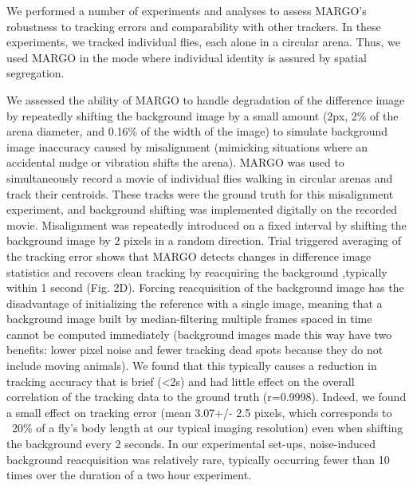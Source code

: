 \documentclass[10pt]{article}
\begin{document}
\begin{multicols}{2}
We performed a number of experiments and analyses to assess MARGO's robustness to tracking errors and comparability with other trackers. In these experiments, we tracked individual flies, each alone in a circular arena. Thus, we used MARGO in the mode where individual identity is assured by spatial segregation.

We assessed the ability of MARGO to handle degradation of the difference image by repeatedly shifting the background image by a small amount (2px, 2\% of the arena diameter, and 0.16\% of the width of the image) to simulate background image inaccuracy caused by misalignment (mimicking situations where an accidental nudge or vibration shifts the arena). MARGO was used to simultaneously record a movie of individual flies walking in circular arenas and track their centroids. These tracks were the ground truth for this misalignment experiment, and background shifting was implemented digitally on the recorded movie. Misalignment was repeatedly introduced on a fixed interval by shifting the background image by 2 pixels in a random direction. Trial triggered averaging of the tracking error shows that MARGO detects changes in difference image statistics and recovers clean tracking by reacquiring the background ,typically within 1 second (Fig. 2D). Forcing reacquisition of the background image has the disadvantage of initializing the reference with a single image, meaning that a background image built by median-filtering multiple frames spaced in time cannot be computed immediately (background images made this way have two benefits: lower pixel noise and fewer tracking dead spots because they do not include moving animals). We found that this typically causes a reduction in tracking accuracy that is brief (<2s) and had little effect on the overall correlation of the tracking data to the ground truth (r=0.9998). Indeed, we found a small effect on tracking error (mean 3.07+/- 2.5 pixels, which corresponds to ~20\% of a fly's body length at our typical imaging resolution) even when shifting the background every 2 seconds. In our experimental set-ups, noise-induced background reacquisition was relatively rare, typically occurring fewer than 10 times over the duration of a two hour experiment.


\end{multicols}
\end{document}
